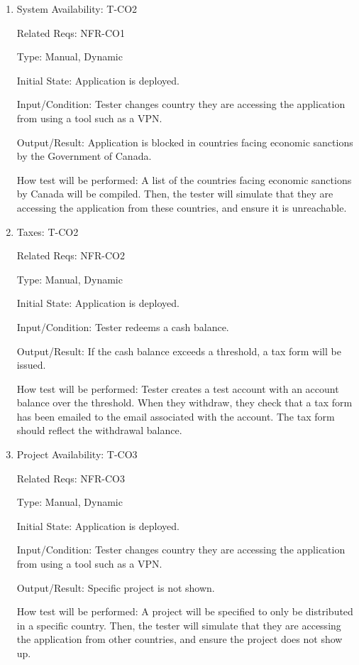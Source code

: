 \documentclass[12pt, titlepage]{article}
\begin{document}
\begin{enumerate}

\item{System Availability: T-CO2\\}

Related Reqs: NFR-CO1

Type: Manual, Dynamic
					
Initial State: Application is deployed.
					
Input/Condition: Tester changes country they are accessing the application from using a tool such as a VPN.
					
Output/Result: Application is blocked in countries facing economic sanctions by the Government of Canada.
					
How test will be performed: A list of the countries facing economic sanctions by Canada will be compiled. Then, the tester will simulate that they are accessing the application from these countries, and ensure it is unreachable.

\item{Taxes: T-CO2\\}

Related Reqs: NFR-CO2

Type: Manual, Dynamic
					
Initial State: Application is deployed.
					
Input/Condition: Tester redeems a cash balance.
					
Output/Result: If the cash balance exceeds a threshold, a tax form will be issued.
					
How test will be performed: Tester creates a test account with an account balance over the threshold. When they withdraw, they check that a tax form has been emailed to the email associated with the account. The tax form should reflect the withdrawal balance.

\item{Project Availability: T-CO3\\}

Related Reqs: NFR-CO3

Type: Manual, Dynamic
					
Initial State: Application is deployed.
					
Input/Condition: Tester changes country they are accessing the application from using a tool such as a VPN.
					
Output/Result: Specific project is not shown.
					
How test will be performed: A project will be specified to only be distributed in a specific country. Then, the tester will simulate that they are accessing the application from other countries, and ensure the project does not show up.

\end{enumerate}
\end{document}
